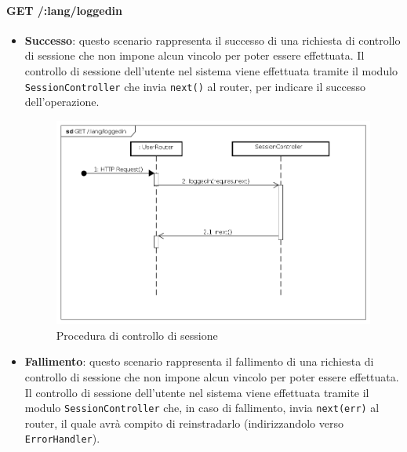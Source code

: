 \paragraph{GET /:lang/loggedin}
\begin{itemize}
\item \textbf{Successo}: questo scenario rappresenta il successo di una richiesta di controllo di sessione che non impone alcun vincolo per poter essere effettuata. Il controllo di sessione dell'utente nel sistema viene effettuata tramite il modulo \texttt{SessionController} che invia \texttt{next()} al router, per indicare il successo dell'operazione.

\label{Procedura di controllo di sessione}
\begin{figure}[ht]
	\centering
	\includegraphics[scale=0.40]{UML/DiagrammiDiSequenza/Back-end/GET__lang_loggedin_success.png}
	\caption{Procedura di controllo di sessione}
\end{figure}
\FloatBarrier
 
\item \textbf{Fallimento}: questo scenario rappresenta il fallimento di una richiesta di controllo di sessione che non impone alcun vincolo per poter essere effettuata. Il controllo di sessione dell'utente nel sistema viene effettuata tramite il modulo \texttt{SessionController} che, in caso di fallimento, invia \texttt{next(err)} al router,  il quale avrà compito di reinstradarlo (indirizzandolo verso \texttt{ErrorHandler}).


\end{itemize}
